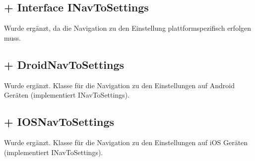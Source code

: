 \documentclass[../implementierung.tex]{subfiles}
\begin{document}
\subsection{+ Interface INavToSettings}
	Wurde ergänzt, da die Navigation zu den Einstellung plattformspezifisch erfolgen muss.
	\begin{itemize}
	\end{itemize}

\subsection{+ DroidNavToSettings}
	Wurde ergänzt. Klasse für die Navigation zu den Einstellungen auf Android Geräten (implementiert INavToSettings).

\subsection{+ IOSNavToSettings}
	Wurde ergänzt. Klasse für die Navigation zu den Einstellungen auf iOS Geräten (implementiert INavToSettings).
\end{document}
